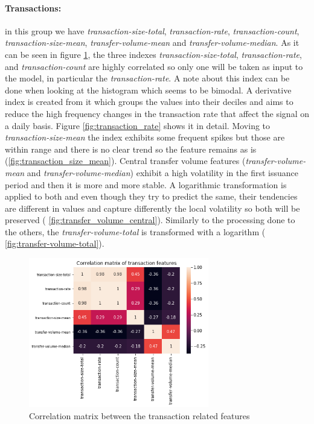 \paragraph{Transactions:} in this group we have \emph{transaction-size-total},
\emph{transaction-rate}, \emph{transaction-count}, \emph{transaction-size-mean},
\emph{transfer-volume-mean} and \emph{transfer-volume-median}. As it can be seen
in figure \ref{fig:transaction_corr}, the three indexes
\emph{transaction-size-total}, \emph{transaction-rate}, and 
\emph{transaction-count} are highly correlated so only one will be taken as
input to the model, in particular the \emph{transaction-rate}. A note about this
index can be done when looking at the histogram which seems to be bimodal. A
derivative index is created from it which groups the values into their deciles
and aims to reduce the high frequency changes in the transaction rate that
affect the signal on a daily basis. Figure \ref{fig:transaction_rate} shows it
in detail. Moving to \emph{transaction-size-mean} the index exhibits some
frequent spikes but those are within range and there is no clear trend so the
feature remains as is (\ref{fig:transaction_size_mean}). Central transfer volume
features (\emph{transfer-volume-mean} and \emph{transfer-volume-median}) exhibit
a high volatility in the first issuance period and then it is more and more
stable. A logarithmic transformation is applied to both and even though they
try to predict the same, their tendencies are different in values and capture
differently the local volatility so both will be preserved (
\ref{fig:transfer_volume_central}). Similarly to the processing done to the
others, the \emph{transfer-volume-total} is transformed with a logarithm (
\ref{fig:transfer-volume-total}).

\begin{figure}[H]
    \centering
    \includegraphics[width=0.7\textwidth]{methods/images/transaction_corr.png}
    \caption{Correlation matrix between the transaction related features}
    \label{fig:transaction_corr}
\end{figure}

